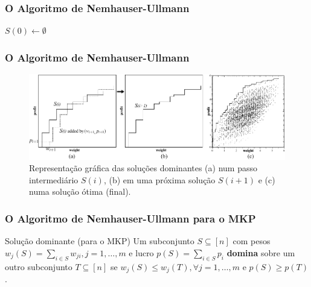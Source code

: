 \documentclass[10pt,fleqn]{beamer}
\renewcommand{\emph}[1]{ {\bf #1} }
\begin{document}
\begin{frame}
  \frametitle{O Algoritmo de Nemhauser-Ullmann}
\begin{algorithm}[H]
 $S(0) \leftarrow \emptyset $\;
 \caption{O Algoritmo de Nemhauser-Ullmann para o KP}
 \label{alg:nu}
\end{algorithm}
\end{frame}

\begin{frame}
  \frametitle{O Algoritmo de Nemhauser-Ullmann}
  \begin{figure}[h]
    \includegraphics[width=\textwidth]{figs/pareto}
    \caption{Representação gráfica das soluções dominantes
    (a) num passo intermediário $S(i)$, (b) em uma próxima solução $S(i+1)$ e
    (c) numa solução ótima (final).}
    \label{fig:pareto}
  \end{figure}
\end{frame}

\begin{frame}
  \frametitle{O Algoritmo de Nemhauser-Ullmann para o MKP}
  \begin{minipage}{12cm}
    \begin{block}{Solução dominante (para o MKP)}
    Um subconjunto $S \subseteq [n]$ com pesos $w_j(S) = \sum_{i \in S} w_{ji}, j = 1, \ldots, m$ e lucro 
	  $p(S) = \sum_{i \in S} p_i$ \emph{domina} sobre um outro subconjunto
	  $T \subseteq [n]$ se $w_j(S) \leqslant w_j(T), \forall j = 1, \ldots, m$ e $p(S) \geqslant p(T)$.
	\end{block}
  \end{minipage}
\end{frame}
\end{document}
